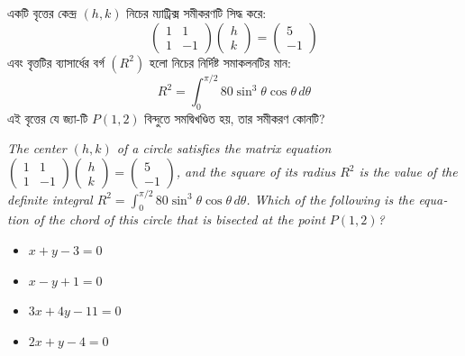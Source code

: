 \documentclass[12pt, a4paper]{article}
\begin{document}
\begin{tcolorbox}[questionbox={প্রশ্ন (Question) 37}]
    \noindent
    একটি বৃত্তের কেন্দ্র $(h, k)$ নিচের ম্যাট্রিক্স সমীকরণটি সিদ্ধ করে:
    \[ \begin{pmatrix} 1 & 1 \\ 1 & -1 \end{pmatrix} \begin{pmatrix} h \\ k \end{pmatrix} = \begin{pmatrix} 5 \\ -1 \end{pmatrix} \]
    এবং বৃত্তটির ব্যাসার্ধের বর্গ $(R^2)$ হলো নিচের নির্দিষ্ট সমাকলনটির মান:
    \[ R^2 = \int_0^{\pi/2} 80 \sin^3\theta \cos\theta \, d\theta \]
    এই বৃত্তের যে জ্যা-টি $P(1, 2)$ বিন্দুতে সমদ্বিখণ্ডিত হয়, তার সমীকরণ কোনটি?
    
    \vspace{0.8em}
    \begin{english}
    \noindent\textit{\color{darkgray}
    The center $(h, k)$ of a circle satisfies the matrix equation $\begin{pmatrix} 1 & 1 \\ 1 & -1 \end{pmatrix} \begin{pmatrix} h \\ k \end{pmatrix} = \begin{pmatrix} 5 \\ -1 \end{pmatrix}$, and the square of its radius $R^2$ is the value of the definite integral $R^2 = \int_0^{\pi/2} 80 \sin^3\theta \cos\theta \, d\theta$. Which of the following is the equation of the chord of this circle that is bisected at the point $P(1, 2)$?
    }
    \end{english}
\end{tcolorbox}

\begin{itemize}[label={}, leftmargin=1cm, itemsep=0.5em]
    \item[\textbf{A)}] $x + y - 3 = 0$
    \item[\textbf{B)}] $x - y + 1 = 0$
    \item[\textbf{C)}] $3x + 4y - 11 = 0$
    \item[\textbf{D)}] $2x + y - 4 = 0$
\end{itemize}
\end{document}

